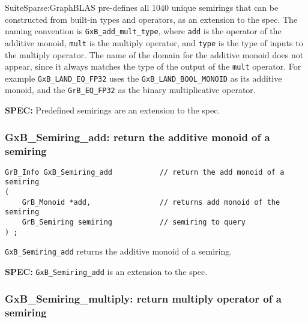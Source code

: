 \documentclass[12pt]{article}
\begin{document}
\vspace{-0.05in}
SuiteSparse:GraphBLAS pre-defines all 1040 unique semirings that can be
constructed from built-in types and operators, as an extension to the spec.
The naming convention is \verb'GxB_add_mult_type', where \verb'add' is the
operator of the additive monoid, \verb'mult' is the multiply operator, and
\verb'type' is the type of inputs to the multiply operator.  The name of the
domain for the additive monoid does not appear, since it always matches the
type of the output of the \verb'mult' operator.  For example
\verb'GxB_LAND_EQ_FP32' uses the \verb'GxB_LAND_BOOL_MONOID' as its additive
monoid, and the \verb'GrB_EQ_FP32' as the binary multiplicative operator.

\begin{spec}
{\bf SPEC:} Predefined semirings are an extension to the spec.
\end{spec}

\newpage
\subsubsection{{\sf GxB\_Semiring\_add:} return the additive monoid of a semiring}
\label{semiring_add}

\begin{mdframed}[userdefinedwidth=6in]
{\footnotesize
\begin{verbatim}
GrB_Info GxB_Semiring_add           // return the add monoid of a semiring
(
    GrB_Monoid *add,                // returns add monoid of the semiring
    GrB_Semiring semiring           // semiring to query
) ;
\end{verbatim}
} \end{mdframed}

\verb'GxB_Semiring_add' returns the additive monoid of a semiring.

\begin{spec}
{\bf SPEC:} \verb'GxB_Semiring_add' is an extension to the spec.
\end{spec}

\subsubsection{{\sf GxB\_Semiring\_multiply:} return multiply operator of a semiring}
\label{semiring_multiply}
\end{document}
